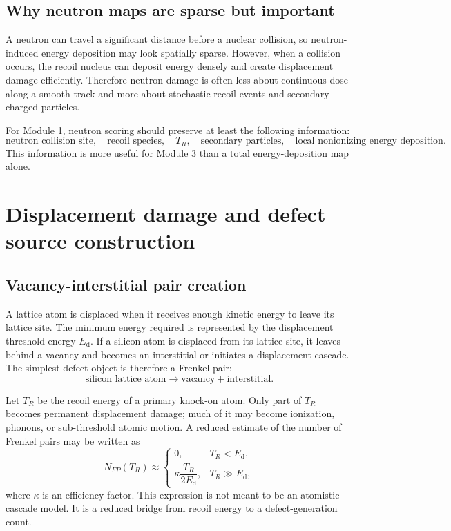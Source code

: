 \documentclass[11pt]{article}
\newcommand{\Ed}{E_{\mathrm{d}}}
\begin{document}
\subsection{Why neutron maps are sparse but important}

A neutron can travel a significant distance before a nuclear collision, so neutron-induced energy deposition may look spatially sparse. However, when a collision occurs, the recoil nucleus can deposit energy densely and create displacement damage efficiently. Therefore neutron damage is often less about continuous dose along a smooth track and more about stochastic recoil events and secondary charged particles.

For Module 1, neutron scoring should preserve at least the following information:
\begin{equation}
\text{neutron collision site},\quad
\text{recoil species},\quad
T_R,\quad
\text{secondary particles},\quad
\text{local nonionizing energy deposition}.
\end{equation}
This information is more useful for Module 3 than a total energy-deposition map alone.

\section{Displacement damage and defect source construction}

\subsection{Vacancy-interstitial pair creation}

A lattice atom is displaced when it receives enough kinetic energy to leave its lattice site. The minimum energy required is represented by the displacement threshold energy $\Ed$. If a silicon atom is displaced from its lattice site, it leaves behind a vacancy and becomes an interstitial or initiates a displacement cascade. The simplest defect object is therefore a Frenkel pair:
\begin{equation}
\text{silicon lattice atom}
\longrightarrow
\text{vacancy} + \text{interstitial}.
\end{equation}

Let $T_R$ be the recoil energy of a primary knock-on atom. Only part of $T_R$ becomes permanent displacement damage; much of it may become ionization, phonons, or sub-threshold atomic motion. A reduced estimate of the number of Frenkel pairs may be written as
\begin{equation}
N_{FP}(T_R)
\approx
\begin{cases}
0, & T_R < \Ed, \\
\kappa\dfrac{T_R}{2\Ed}, & T_R \gg \Ed,
\end{cases}
\label{eq:frenkel_pair_estimator}
\end{equation}
where $\kappa$ is an efficiency factor. This expression is not meant to be an atomistic cascade model. It is a reduced bridge from recoil energy to a defect-generation count.
\end{document}
